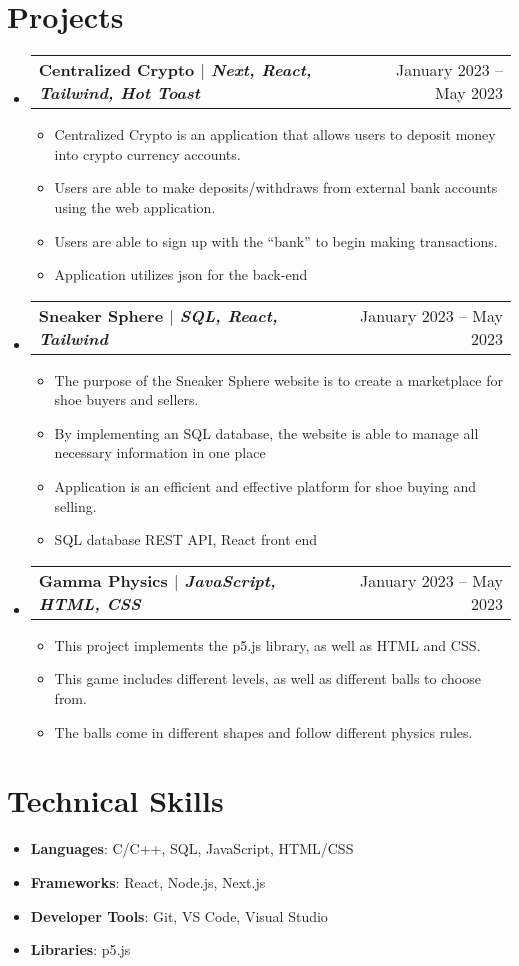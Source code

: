 \documentclass[letterpaper,11pt]{article}
\makeatletter
\newcommand{\projectItem}[1]{
  \item\small{#1}
}
\newcommand{\projectSubHeading}[2]{
  \vspace{-1pt}\item
    \begin{tabular*}{0.97\textwidth}[t]{l@{\extracolsep{\fill}}r}
      \textbf{#1} & #2 \\
    \end{tabular*}\vspace{-5pt}
}
\newcommand{\resumeSubHeadingListStart}{\begin{itemize}[leftmargin=*,label=\textbullet]}
\newcommand{\resumeSubHeadingListEnd}{\end{itemize}}
\newcommand{\resumeItemListStart}{\begin{itemize}[leftmargin=*,label=\textcolor{black}{$\circ$}]}
\newcommand{\resumeItemListEnd}{\end{itemize}}
\makeatother
\begin{document}
\section{Projects}
  \resumeSubHeadingListStart
    \projectSubHeading
      {\textbf{Centralized Crypto} $|$ \emph{Next, React, Tailwind, Hot Toast}}{January 2023 -- May 2023}
      \resumeItemListStart
        \projectItem
          {Centralized Crypto is an application that allows users to deposit money into crypto currency accounts.}
        \projectItem
          {Users are able to make deposits/withdraws from external bank accounts using the web application.}
        \projectItem
          {Users are able to sign up with the “bank” to begin making transactions.}
        \projectItem
          {Application utilizes json for the back-end}
      \resumeItemListEnd
    \projectSubHeading
      {\textbf{Sneaker Sphere} $|$ \emph{SQL, React, Tailwind}}{January 2023 -- May 2023}
      \resumeItemListStart
        \projectItem
          {The purpose of the Sneaker Sphere website is to create a marketplace for shoe buyers and sellers.}
        \projectItem
          {By implementing an SQL database, the website is able to manage all necessary information in one place}
        \projectItem
          {Application is an efficient and effective platform for shoe buying and selling.}
        \projectItem
          {SQL database REST API, React front end}
      \resumeItemListEnd
    \projectSubHeading
      {\textbf{Gamma Physics} $|$ \emph{JavaScript, HTML, CSS}}{January 2023 -- May 2023}
      \resumeItemListStart
        \projectItem
          {This project implements the p5.js library, as well as HTML and CSS.}
        \projectItem
          {This game includes different levels, as well as different balls to choose from.}
        \projectItem
          {The balls come in different shapes and follow different physics rules.}
      \resumeItemListEnd
  \resumeSubHeadingListEnd


\section{Technical Skills}
\begin{itemize}[leftmargin=*]
    \item \small{\textbf{Languages}{: C/C++, SQL, JavaScript, HTML/CSS}}
    \item \small{\textbf{Frameworks}{: React, Node.js, Next.js}}
    \item \small{\textbf{Developer Tools}{: Git, VS Code, Visual Studio}}
    \item \small{\textbf{Libraries}{: p5.js}}
\end{itemize}



\end{document}
